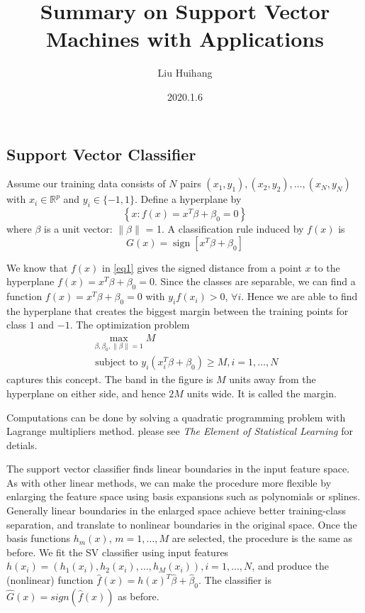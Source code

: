 \documentclass[
]{article}
\title{Summary on Support Vector Machines with Applications}
\author{Liu Huihang}
\date{2020.1.6}
\begin{document}
\maketitle

\hypertarget{support-vector-classifier}{%
\subsection{Support Vector Classifier}\label{support-vector-classifier}}

Assume our training data consists of \(N\) pairs
\((x_1,y_1), (x_2,y_2),\dots, (x_N,y_N)\) with \(x_i\in\mathbb{R}^p\)
and \(y_i\in\{ -1, 1 \}\). Define a hyperplane by
\begin{equation}\label{eq1}
  \left\{x: f(x)=x^{T} \beta+\beta_{0}=0\right\}
\end{equation} where \(\beta\) is a unit vector: \(\|\beta\|\) = 1. A
classification rule induced by \(f(x)\) is \begin{equation}
  G(x)=\operatorname{sign}\left[x^{T} \beta+\beta_{0}\right]
\end{equation}

We know that \(f(x)\) in \eqref{eq1} gives the signed distance from a
point \(x\) to the hyperplane \(f(x) = x^T\beta + \beta_0 = 0\). Since
the classes are separable, we can find a function
\(f(x) = x^T\beta + \beta_0 = 0\) with \(y_i f(x_i) > 0\),
\(\forall i\). Hence we are able to find the hyperplane that creates the
biggest margin between the training points for class \(1\) and \(−1\).
The optimization problem \begin{equation}
  \begin{array}{c}
    {\max_{\beta, \beta_{0}, \| \beta \|=1} M} \\ 
    {\text { subject to } y_{i}\left(x_{i}^{T} \beta+\beta_{0}\right) \geq M, i=1, \ldots, N}
  \end{array}
\end{equation} captures this concept. The band in the figure is \(M\)
units away from the hyperplane on either side, and hence \(2M\) units
wide. It is called the margin.

Computations can be done by solving a quadratic programming problem with
Lagrange multipliers method. please see
\emph{The Element of Statistical Learning} for detials.

The support vector classifier finds linear boundaries in the input
feature space. As with other linear methods, we can make the procedure
more flexible by enlarging the feature space using basis expansions such
as polynomials or splines. Generally linear boundaries in the enlarged
space achieve better training-class separation, and translate to
nonlinear boundaries in the original space. Once the basis functions
\(h_m(x)\), \(m = 1, \dots , M\) are selected, the procedure is the same
as before. We fit the SV classifier using input features
\(h(x_i) = (h_1(x_i),h_2(x_i), \dots , h_M(x_i)), i = 1, \dots , N\),
and produce the (nonlinear) function
\(\hat{f}(x) = h(x)^T \hat{\beta} + \hat{\beta}_0\). The classifier is
\(\hat{G}(x) = sign(\hat{f}(x))\) as before.
\end{document}

